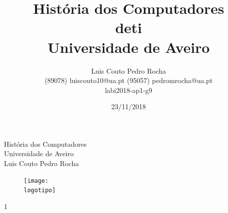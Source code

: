 \documentclass{report}
\begin{document}
%
\def\titulo{História dos Computadores}
\def\data{23/11/2018}
\def\autores{Luis Couto  Pedro Rocha}
\def\autorescontactos{(89078) luiscouto10@ua.pt  (95057) pedromrocha@ua.pt}
\def\versao{1}
\def\departamento{\acs{deti}}
\def\empresa{Universidade de Aveiro}
\def\logotipo{ua.pdf}
\def\projeto{labi2018-ap1-g9}
%
%
\begin{titlepage}

\begin{center}
%
\vspace*{50mm}
%
{\Huge \titulo}\\ 
%
\vspace{10mm}
%
{\Large \empresa}\\
%
\vspace{10mm}
%
{\LARGE \autores}\\ 
%
\vspace{30mm}
%
\begin{figure}[h]
\center
\texttt{[image: \\logotipo]}
\end{figure}
%
\vspace{30mm}
\end{center}
%
\begin{flushright}
\versao
\end{flushright}
\end{titlepage}


\title{%
{\Huge\textbf{\titulo}}\\
{\Large \departamento\\ \empresa}
}
%
\author{%
    \autores \\
    \autorescontactos \\
    \projeto
}
%
\date{\data}
%
\maketitle

 
\end{document}
